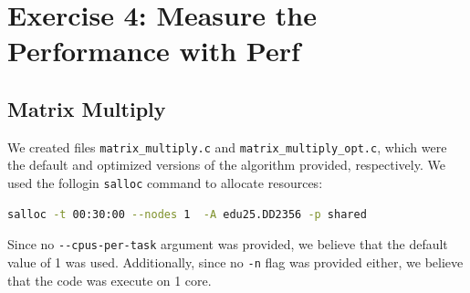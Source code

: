 \documentclass[a4paper,10pt]{article}
\begin{document}
\section{Exercise 4: Measure the Performance with Perf}
\subsection{Matrix Multiply}
\label{sec:matrix_multiply}
We created files \verb|matrix_multiply.c| and \verb|matrix_multiply_opt.c|, which were the default and optimized versions of the algorithm provided, respectively. We used the follogin \verb|salloc| command to allocate resources: 

\begin{lstlisting}[language=bash,basicstyle=\ttfamily]
salloc -t 00:30:00 --nodes 1  -A edu25.DD2356 -p shared
\end{lstlisting}
Since no \verb|--cpus-per-task| argument was provided, we believe that the default value of 1 was used. Additionally, since no \verb|-n| flag was provided either, we believe that the code was execute on 1 core. 
\end{document}
